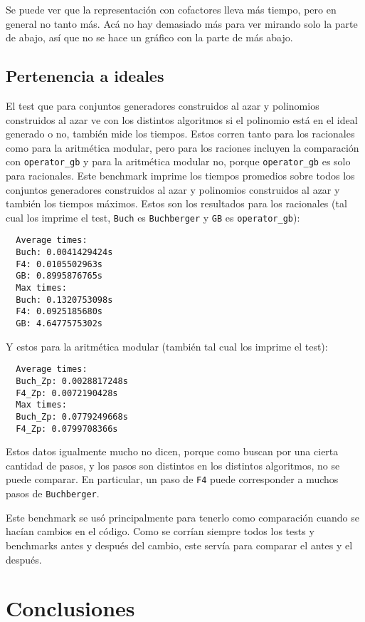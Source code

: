 \documentclass[12pt]{report}
\theoremstyle{customstyle}
\theoremstyle{factstyle}
\begin{document}
Se puede ver que la representación con cofactores lleva más tiempo, pero en general no tanto más. Acá no hay demasiado más para ver mirando solo la parte de abajo, así que no se hace un gráfico con la parte de más abajo.

\section{Pertenencia a ideales}

El test que para conjuntos generadores construidos al azar y polinomios construidos al azar ve con los distintos algoritmos si el polinomio está en el ideal generado o no, también mide los tiempos. Estos corren tanto para los racionales como para la aritmética modular, pero para los raciones incluyen la comparación con \texttt{operator\_gb} y para la aritmética modular no, porque \texttt{operator\_gb} es solo para racionales. Este benchmark imprime los tiempos promedios sobre todos los conjuntos generadores construidos al azar y polinomios construidos al azar y también los tiempos máximos. Estos son los resultados para los racionales (tal cual los imprime el test, \texttt{Buch} es \texttt{Buchberger} y \texttt{GB} es \texttt{operator\_gb}):

\begin{verbatim}
  Average times:
  Buch: 0.0041429424s
  F4: 0.0105502963s
  GB: 0.8995876765s
  Max times:
  Buch: 0.1320753098s
  F4: 0.0925185680s
  GB: 4.6477575302s
\end{verbatim}

Y estos para la aritmética modular (también tal cual los imprime el test):

\begin{verbatim}
  Average times:
  Buch_Zp: 0.0028817248s
  F4_Zp: 0.0072190428s
  Max times:
  Buch_Zp: 0.0779249668s
  F4_Zp: 0.0799708366s
\end{verbatim}

Estos datos igualmente mucho no dicen, porque como buscan por una cierta cantidad de pasos, y los pasos son distintos en los distintos algoritmos, no se puede comparar. En particular, un paso de \texttt{F4} puede corresponder a muchos pasos de \texttt{Buchberger}.

Este benchmark se usó principalmente para tenerlo como comparación cuando se hacían cambios en el código. Como se corrían siempre todos los tests y benchmarks antes y después del cambio, este servía para comparar el antes y el después.

\chapter{Conclusiones}
\end{document}

